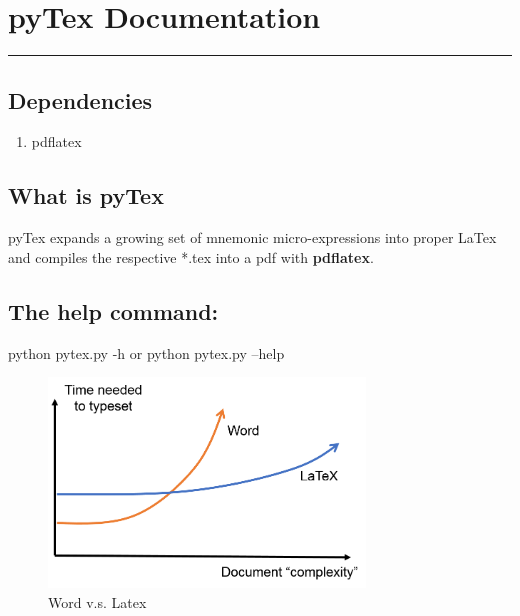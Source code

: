 \documentclass{article}
\begin{document}
\section*{pyTex Documentation}
\rule{\linewidth}{0.2mm}
\subsection*{Dependencies}
\begin{enumerate}
\item pdflatex
\end{enumerate}
\subsection*{What is pyTex}
pyTex expands a growing set of mnemonic micro-expressions into proper LaTex and compiles the respective *.tex into a pdf with \textbf{pdflatex}.
\subsection*{The help command:}
\begin{tcolorbox}
python pytex.py -h \quad or \quad python pytex.py --help
\end{tcolorbox}
\begin{figure}[H]
  \begin{center}
    \includegraphics[width=0.75\textwidth]{word_vs_latex.png}
    \caption{Word v.s. Latex}
    \label{label}
  \end{center}
\end{figure}
\end{document}
